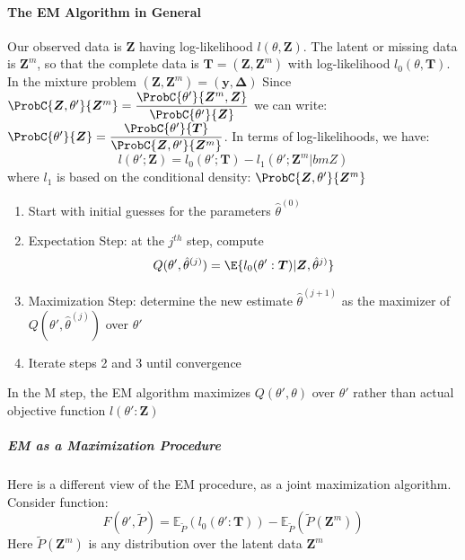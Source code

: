 \paragraph{The EM Algorithm in General}
Our observed data is $\bm{Z}$ having log-likelihood $l(\theta,\bm{Z})$. The latent or missing data
is $\bm{Z}^{m}$, so that the complete data is $\bm{T}=(\bm{Z},\bm{Z}^{m})$ with log-likelihood 
$l_{0}(\theta,\bm{T})$. In the mixture problem $(\bm{Z},\bm{Z}^{m}) = (\bm{y},\bm{\Delta})$
Since $\ProbC{\bm{Z},\theta'}{\bm{Z}^{m}}=\dfrac{\ProbC{\theta'}{\bm{Z}^{m},\bm{Z}}}{\ProbC{\theta'}{\bm{Z}}}$ we can write:
$\ProbC{\theta'}{\bm{Z}}=\dfrac{\ProbC{\theta'}{\bm{T}}}{\ProbC{\bm{Z},\theta'}{\bm{Z}^{m}}}$.
In terms of log-likelihoods, we have:
$$ l(\theta';\bm{Z}) = l_{0}(\theta'; \bm{T}) - l_{1}(\theta';\bm{Z}^{m}|bm{Z})$$ where $l_{1}$ is
based on the conditional density: $\ProbC{\bm{Z},\theta'}{\bm{Z}^{m}}$
\begin{enumerate}
	\item Start with initial guesses for the parameters $\hat{\theta}^{(0)}$
	\item Expectation Step: at the $j^{th}$ step, compute 
		$$ Q(\theta',\hat{\theta}^{(j)}) = \E{l_{0}(\theta':\bm{T})|\bm{Z},\hat{
		\theta}^{j)}}$$
	\item Maximization Step: determine the new estimate $\hat{\theta}^{(j+1)}$ as the 
		maximizer of $Q\left(\theta',\hat{\theta}^{(j)}\right)$ over $\theta'$
	\item Iterate steps 2 and 3 until convergence
\end{enumerate}
In the M step, the EM algorithm maximizes $Q(\theta', \theta)$ over $\theta'$ rather than
actual objective function $l(\theta':\bm{Z})$
\subparagraph{EM as a Maximization Procedure}
Here is a different view of the EM procedure, as a joint maximization algorithm. Consider 
function:
$$ F(\theta',\tilde{P})= \mathbb{E}_{\tilde{P}}\left(l_{0}(\theta':\bm{T})\right)-
\mathbb{E}_{\tilde{P}}\left(\tilde{P}(\bm{Z}^{m})\right)$$
Here $\tilde{P}(\bm{Z}^{m})$ is any distribution over the latent data $\bm{Z}^{m}$

